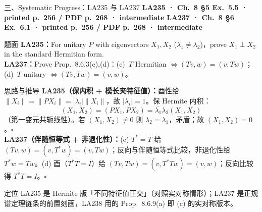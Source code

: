 \documentclass[aspectratio=169,10pt,fontset=none]{ctexbeamer}
\newcommand{\ex}[1]{\textcolor{accent}{\footnotesize\bfseries #1}}
\begin{document}
\begin{frame}[t]{三、Systematic Progress：LA235 与 LA237}
  \leavevmode\ex{LA235 · Ch.~8 §5 Ex.~5.5 · printed p.~256 / PDF p.~268 · intermediate}\quad
  \ex{LA237 · Ch.~8 §6 Ex.~6.1 · printed p.~256 / PDF p.~268 · intermediate}
  \begin{block}{\footnotesize 题面}
    \scriptsize \textbf{LA235：}For unitary $P$ with eigenvectors $X_1,X_2$ ($\lambda_1\ne\lambda_2$)，prove $X_1\perp X_2$ in the standard Hermitian form.\\
    \textbf{LA237：}Prove Prop.~8.6.3(c),(d)：(c)~$T$ Hermitian $\iff(Tv,w)=(v,Tw)$；(d)~$T$ unitary $\iff(Tv,Tw)=(v,w)$。
  \end{block}
  \begin{exampleblock}{\footnotesize 思路与推导}
    \scriptsize
    \textbf{LA235（保内积 + 模长夹特征值）：}酉性给 $\lVert X_i\rVert=\lVert PX_i\rVert=|\lambda_i|\lVert X_i\rVert$，故 $|\lambda_i|=1$。保 Hermite 内积：
    $$(X_1,X_2)=(PX_1,PX_2)=\overline{\lambda_1}\lambda_2(X_1,X_2)$$
    （第一变元共轭线性）。若 $(X_1,X_2)\ne0$ 则 $\lambda_2=\lambda_1$，矛盾；故 $(X_1,X_2)=0$。$\square$\\[2pt]
    \textbf{LA237（伴随恒等式 + 非退化性）：}(c) $T^*=T$ 给 $(Tv,w)=(v,T^*w)=(v,Tw)$；反向与伴随恒等式比较，非退化性给 $T^*w=Tw$。(d) 酉（$T^*T=I$）给 $(Tv,Tw)=(v,T^*Tw)=(v,w)$；反向比较得 $T^*T=I$。$\square$
  \end{exampleblock}
  \begin{block}{\footnotesize 定位}
    \scriptsize LA235 是 Hermite 版「不同特征值正交」（对照实对称情形）；LA237 是正规谱定理链条的前置刻画，LA238 用的 Prop.~8.6.9(a) 即 (c) 的实对称版本。
  \end{block}
\end{frame}
\end{document}
